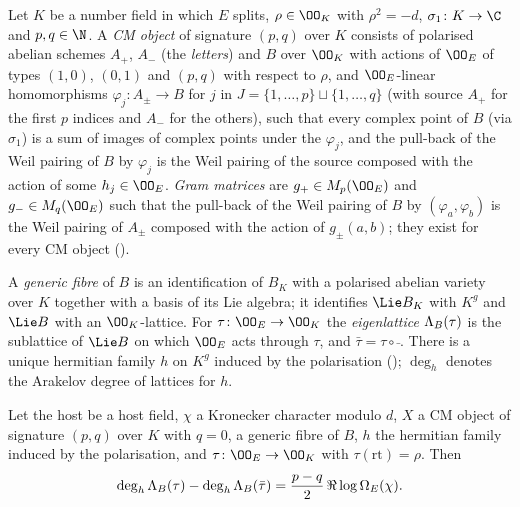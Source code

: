 \begin{definition}[CM objects]\label{pf:lift1:cmobj}
Let $K$ be a number field in which $E$ splits, $\rho\in\OO_K$ with $\rho^2=-d$, $\sigma_1\colon K\to\C$
and $p,q\in\N$. A \emph{CM object} of signature $(p,q)$ over $K$ consists of polarised
abelian schemes $A_+$, $A_-$ (the \emph{letters}) and $B$ over $\OO_K$ with actions of $\OO_E$ of types $(1,0)$, $(0,1)$
and $(p,q)$ with respect to $\rho$, and $\OO_E$-linear homomorphisms $\varphi_j\colon A_\pm\to B$ for $j$
in $J=\{1,\dots,p\}\sqcup\{1,\dots,q\}$ (with source $A_+$ for the first $p$ indices and $A_-$ for the
others), such that every complex point of $B$ (via $\sigma_1$) is a sum of images of complex points
under the $\varphi_j$, and the pull-back of the Weil pairing of $B$ by $\varphi_j$ is the Weil pairing of
the source composed with the action of some $h_j\in\OO_E$. \emph{Gram matrices} are
$g_+\in M_p(\OO_E)$ and $g_-\in M_q(\OO_E)$ such that the pull-back of the Weil pairing of $B$ by
$(\varphi_a,\varphi_b)$ is the Weil pairing of $A_\pm$ composed with the action of $g_\pm(a,b)$; they exist
for every CM object ().

A \emph{generic fibre} of $B$ is an identification of $B_K$ with a polarised abelian variety over $K$
together with a basis of its Lie algebra; it identifies $\Lie B_K$ with $K^g$ and $\Lie B$ with an
$\OO_K$-lattice. For $\tau\colon\OO_E\to\OO_K$ the \emph{eigenlattice} $\Lambda_B(\tau)$ is the
sublattice of $\Lie B$ on which $\OO_E$ acts through $\tau$, and $\bar\tau=\tau\circ\bar{\ }$. There is a
unique hermitian family $h$ on $K^g$ induced by the polarisation
(); $\deg_h$ denotes the Arakelov degree of
lattices for $h$.
\end{definition}

\begin{theorem}\label{pf:lift1:cmdiff}
Let the host be a host field, $\chi$ a Kronecker character modulo $d$, $X$ a CM object of signature
$(p,q)$ over $K$ with $q=0$, a generic fibre of $B$, $h$ the hermitian family induced by the
polarisation, and $\tau\colon\OO_E\to\OO_K$ with $\tau(\mathrm{rt})=\rho$. Then
\[
\deg_h\Lambda_B(\tau)-\deg_h\Lambda_B(\bar\tau)=\frac{p-q}2\,\Re\log\Omega_E(\chi).
\]
\end{theorem}

